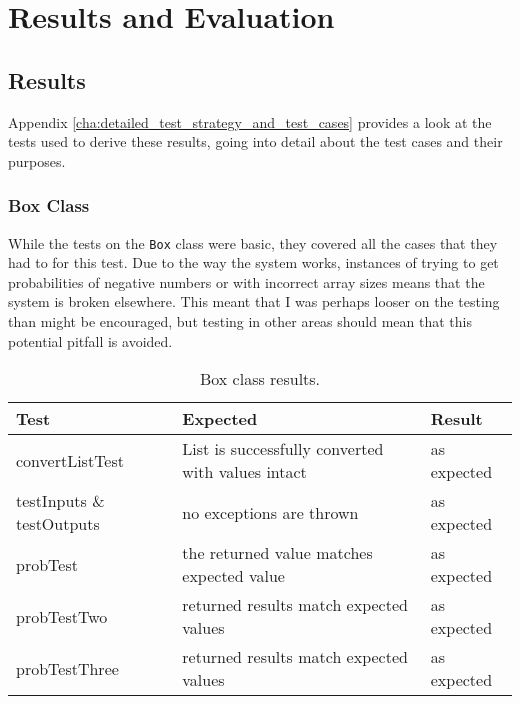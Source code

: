 \documentclass[report.tex]{subfiles}
\begin{document}
\chapter{Results and Evaluation} %
\label{cha:results_and_evaluation}

\section{Results} %
\label{sec:results}
Appendix \ref{cha:detailed_test_strategy_and_test_cases} provides a look at the
tests used to derive these results, going into detail about the test cases and
their purposes.

\newpage
\subsection{Box Class} %
\label{sub:box_class_res}
While the tests on the \texttt{Box} class were basic, they covered all the cases
that they had to for this test. Due to the way the system works, instances of
trying to get probabilities of negative numbers or with incorrect array sizes
means that the system is broken elsewhere. This meant that I was perhaps looser
on the testing than might be encouraged, but testing in other areas should mean
that this potential pitfall is avoided.

\begin{table}[H]
    \centering
    \begin{tabular}{l | p{6cm} | l}
    Test & Expected & Result \\    
    \hline
    convertListTest & List is successfully converted with values intact
    & as expected \\
    testInputs \& testOutputs & no exceptions are thrown & as expected \\
    probTest & the returned value matches expected value & as expected \\
    probTestTwo & returned results match expected values & as expected \\
    probTestThree & returned results match expected values
    & as expected \\
    \end{tabular}
    \caption{Box class results.}
  \label{tab:box_result}
\end{table}
\newpage
\end{document}

